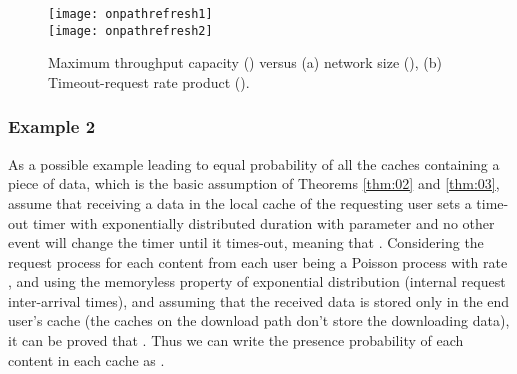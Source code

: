 \documentclass[journal]{IEEEtran}
\theoremstyle{plain}
\theoremstyle{remark}
\begin{document}
\begin{figure}[http]
    \center
       \texttt{[image: onpathrefresh1]}\\
			 \texttt{[image: onpathrefresh2]}\\
      \caption{Maximum throughput capacity () versus (a) network size (), (b) Timeout-request rate product ().}
    \label{fig:onpath}
\end{figure}

\begin{comment}

since the time of that data being received and cached till the time of expiration, and  denote the total number of incoming requests (internal and external) for a cached data before its expiration. If  requests are received during the available data time, average value of  is . The average value of  then is given by

 

Denoting the  time-out time and inter request time by  and , respectively, the probability that no request is received before the first timer expiration time is the probability that . The probability that exactly  requests are received is the probability that  for  and . Assuming independence between the expiration times and also the request inter-arrival times, 



Where the index  and  is omitted in the second equation because of identical distributions of expiration times and also request inter-arrival times.



Thus, , and

 

Therefore  and the probability of the data being in a cache is .
\end{comment}


\subsubsection{Example 2}
\label{ex:02}

As a possible example leading to equal probability of all the caches containing a piece of data, which is the basic assumption of Theorems \ref{thm:02} and \ref{thm:03}, assume that receiving a data in the local cache of the requesting user sets a time-out timer with exponentially distributed duration with parameter  and no other event will change the timer until it times-out, meaning that . Considering the request process for each content from each user being a Poisson process with rate , and using the memoryless property of exponential distribution (internal request inter-arrival times), and assuming that the received data is stored only in the end user's cache (the caches on the download path don't store the downloading data), it can be proved that . Thus we can write the presence probability of each content in each cache as . 
\end{document}
